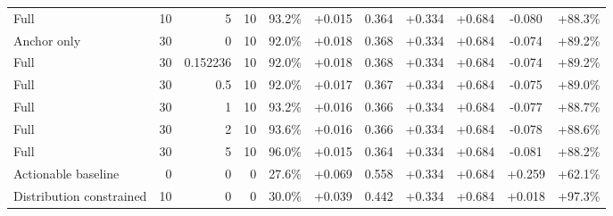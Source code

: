 \begin{table}[htbp]
\begin{tabular}{lrrrccccccc}
Full & 10 & 5 & 10 & 93.2\% & +0.015 & 0.364 & +0.334 & +0.684 & -0.080 & +88.3\% \\
Anchor only & 30 & 0 & 10 & 92.0\% & +0.018 & 0.368 & +0.334 & +0.684 & -0.074 & +89.2\% \\
Full & 30 & 0.152236 & 10 & 92.0\% & +0.018 & 0.368 & +0.334 & +0.684 & -0.074 & +89.2\% \\
Full & 30 & 0.5 & 10 & 92.0\% & +0.017 & 0.367 & +0.334 & +0.684 & -0.075 & +89.0\% \\
Full & 30 & 1 & 10 & 93.2\% & +0.016 & 0.366 & +0.334 & +0.684 & -0.077 & +88.7\% \\
Full & 30 & 2 & 10 & 93.6\% & +0.016 & 0.366 & +0.334 & +0.684 & -0.078 & +88.6\% \\
Full & 30 & 5 & 10 & 96.0\% & +0.015 & 0.364 & +0.334 & +0.684 & -0.081 & +88.2\% \\
Actionable baseline & 0 & 0 & 0 & 27.6\% & +0.069 & 0.558 & +0.334 & +0.684 & +0.259 & +62.1\% \\
Distribution constrained & 10 & 0 & 0 & 30.0\% & +0.039 & 0.442 & +0.334 & +0.684 & +0.018 & +97.3\% \\
\bottomrule
\end{tabular}
\end{table}